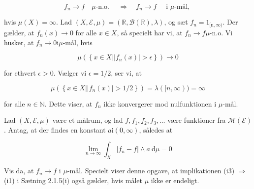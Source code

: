 \documentclass{Class}
\begin{document}
$$
f_n \rightarrow f \quad \mu \text {-n.o. } \quad \Longrightarrow \quad f_n \rightarrow f \quad \text { i } \mu \text {-mål, }
$$

hvis $\mu(X)=\infty$.
\solution
Lad $(X, \mathcal{E}, \mu)=(\mathbb{R}, \mathcal{B}(\mathbb{R}), \lambda)$, og sæt $f_n=1_{[\mathrm{n}, \infty)}$. Der gælder, at $f_n(x) \rightarrow 0$ for alle $x \in X$, så specielt har vi, at $f_n \rightarrow f \mu$-n.o. Vi husker, at $f_n \rightarrow 0 \mathrm{i} \mu$-mål, hvis

$$
\mu\left(\left\{x \in X\left|\left|f_n(x)\right|>\epsilon\right\}\right) \rightarrow 0\right.
$$

for ethvert $\epsilon>0$. Vælger vi $\epsilon=1 / 2$, ser vi, at

$$
\mu\left(\left\{x \in X\left|\left|f_n(x)\right|>1 / 2\right\}\right)=\lambda([n, \infty))=\infty\right.
$$

for alle $n \in \mathbb{N}$. Dette viser, at $f_n$ ikke konvergerer mod nulfunktionen i $\mu$-mål.


Lad $(X, \mathcal{E}, \mu)$ være et målrum, og lad $f, f_1, f_2, f_3, \ldots$ være funktioner fra $\mathcal{M}(\mathcal{E})$. Antag, at der findes en konstant $a \mathrm{i}(0, \infty)$, således at

$$
\lim _{n \rightarrow \infty} \int_X\left|f_n-f\right| \wedge a \mathrm{~d} \mu=0
$$


Vis da, at $f_n \rightarrow f$ i $\mu$-mål.
Specielt viser denne opgave, at implikationen (i3) $\Rightarrow$ (i1) i Sætning 2.1.5(i) også gælder, hvis målet $\mu$ ikke er endeligt.
\solution
\end{document}

